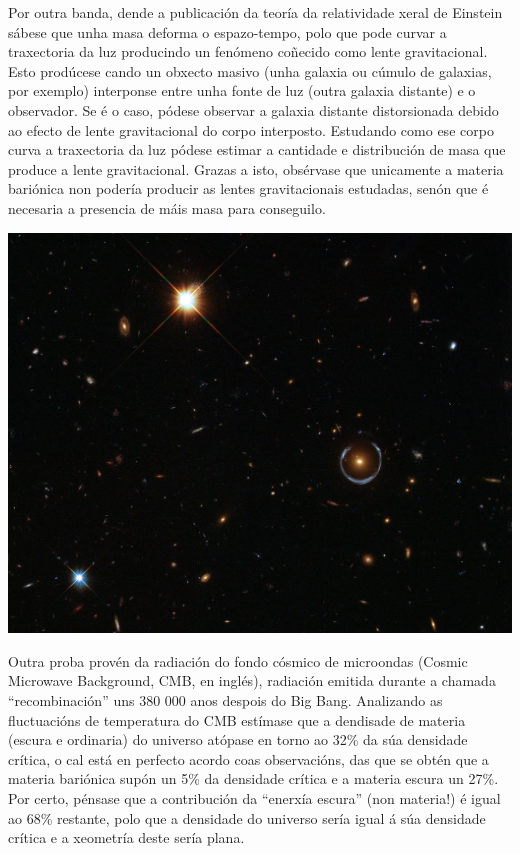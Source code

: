 \begin{refsection}
\begin{multicols}{2}
Por outra banda, dende a publicación da teoría da relatividade xeral de Einstein sábese que unha masa deforma o espazo-tempo, polo que pode curvar a traxectoria da luz producindo un fenómeno coñecido como lente gravitacional. Esto prodúcese cando un obxecto masivo (unha galaxia ou cúmulo de galaxias, por exemplo) interponse entre unha fonte de luz (outra galaxia distante) e o observador. Se é o caso, pódese observar a galaxia distante distorsionada debido ao efecto de lente gravitacional do corpo interposto. Estudando como ese corpo curva a traxectoria da luz pódese estimar a cantidade e distribución de masa que produce a lente gravitacional. Grazas a isto, obsérvase que unicamente a materia bariónica non podería producir as lentes gravitacionais estudadas, senón que é necesaria a presencia de máis masa para conseguilo.\\

\begin{center}
    \includegraphics[width=0.9\linewidth]{revistas/002/imaxes/materiaescura1.png}
\end{center}


Outra proba provén da radiación do fondo cósmico de microondas (Cosmic Microwave Background, CMB, en inglés), radiación emitida durante a chamada “recombinación” uns 380 000 anos despois do Big Bang. Analizando as fluctuacións de temperatura do CMB estímase que a dendisade de materia (escura e ordinaria) do universo atópase en torno ao 32\% da súa densidade crítica, o cal está en perfecto acordo coas observacións, das que se obtén que a materia bariónica supón un 5\% da densidade crítica e a materia escura un 27\%. Por certo, pénsase que a contribución da “enerxía escura” (non materia!) é igual ao 68\% restante, polo que a densidade do universo sería igual á súa densidade crítica e a xeometría deste sería plana.


\end{multicols}
\end{refsection}
